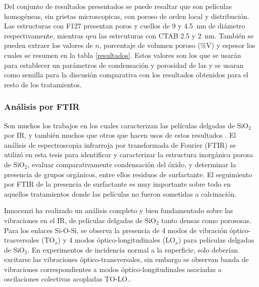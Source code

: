 		 	Del conjunto de resultados presentados se puede resaltar que son películas homogéneas, sin grietas microscopicas, con poroso de orden local y distribución. Las \pdm\space estructuras con F127 presentan poros	y cuellos de 9 y \SI{4.5}{\nm} de diámetro respectivamente, mientras qeu las estrcuturas con CTAB 2.5 y \SI{2}{\nm}. También se pueden extraer los valores de $n$, porcentaje de volumen poroso (\%V) y espesor los cuales se resumen en la tabla \ref{resultados}. Estos valores son los que se usarán para establecer un parámetros de condensación y porosidad de las \pdm y se usaran como semilla para la discusión comparativa con los resultados obtenidos para el resto de los tratamientos.

	    \subsubsection{Análisis por FTIR}\label{sec:Analisis_IR}

		 Son muchos los trabajos en los cuales caracterizan las películas delgadas de SiO$_2$ por IR\cite{Olsen1989,Almeida1990,Redol1997,Innocenzi2003}, y también muchos que otros que hacen usos de estos resultados \cite{Angelome2008,Calvo2008,Calvo20210}.
		 El análisis de espectroscopia infrarroja por transformada de Fourier (FTIR) se utilizó en esta tesis para identificar y caracterizar la estructura inorgánica porosa de SiO$_2$, evaluar comparativamente condensación del óxido, y determinar la presencia de grupos orgánicos, entre ellos residuos de surfactante. El seguimiento por FTIR de la presencia de surfactante es muy importante sobre todo en aquellos tratamientos donde las películas no fueron sometidas a calcinación.

		Innocenzi\cite{Innocenzi2003} ha realizado un análisis completo y bien fundamentado sobre las vibraciones en el IR, de películas delgadas de SiO$_2$ tanto densas como porososas. Para los enlaces Si-O-Si, se observa la presencia de 4 modos de vibración óptico-trasversales (TO$_x$) y 4 modos óptico-longitudinales (LO$_x$) para películas delgadas de SiO$_2$. En experimentos de incidencia normal a la superficie, solo deberían excitarse las vibraciones óptico-transversales, sin embargo se observan banda de vibraciones correspondientes a modos óptico-longitudinales asociadas a oscilaciones colectivas acopladas TO-LO.\cite{Pai1986,Grosse1986,Innocenzi2003}.

